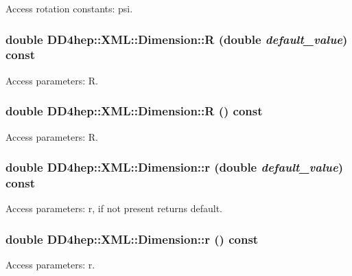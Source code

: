 Access rotation constants: psi. \hypertarget{struct_d_d4hep_1_1_x_m_l_1_1_dimension_aa4f4694169e94f3050a1698cebaeb438}{
\subsubsection[{R}]{\setlength{\rightskip}{0pt plus 5cm}double DD4hep::XML::Dimension::R (double {\em default\_\-value}) const}}
\label{struct_d_d4hep_1_1_x_m_l_1_1_dimension_aa4f4694169e94f3050a1698cebaeb438}


Access parameters: R. \hypertarget{struct_d_d4hep_1_1_x_m_l_1_1_dimension_aa41c99f0c240e07ced8f41f70b5e8bcf}{
\subsubsection[{R}]{\setlength{\rightskip}{0pt plus 5cm}double DD4hep::XML::Dimension::R () const}}
\label{struct_d_d4hep_1_1_x_m_l_1_1_dimension_aa41c99f0c240e07ced8f41f70b5e8bcf}


Access parameters: R. \hypertarget{struct_d_d4hep_1_1_x_m_l_1_1_dimension_ab945b3a0932b1d8ee96224b35064fd79}{
\subsubsection[{r}]{\setlength{\rightskip}{0pt plus 5cm}double DD4hep::XML::Dimension::r (double {\em default\_\-value}) const}}
\label{struct_d_d4hep_1_1_x_m_l_1_1_dimension_ab945b3a0932b1d8ee96224b35064fd79}


Access parameters: r, if not present returns default. \hypertarget{struct_d_d4hep_1_1_x_m_l_1_1_dimension_a268d60ab28cdeaa6781cd10f8a0293bd}{
\subsubsection[{r}]{\setlength{\rightskip}{0pt plus 5cm}double DD4hep::XML::Dimension::r () const}}
\label{struct_d_d4hep_1_1_x_m_l_1_1_dimension_a268d60ab28cdeaa6781cd10f8a0293bd}


Access parameters: r. 

